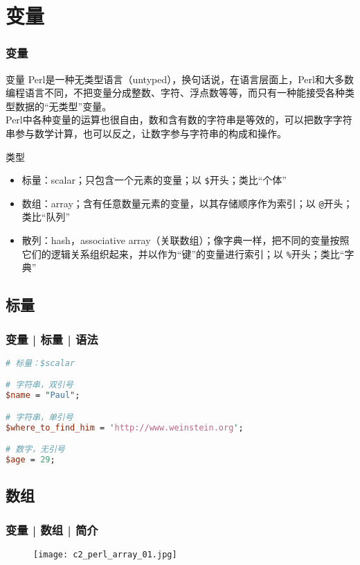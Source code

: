 \section{变量}
\begin{frame}[fragile]
  \frametitle{变量}
  \begin{block}{变量}
    Perl是一种无类型语言（untyped），换句话说，在语言层面上，Perl和大多数编程语言不同，不把变量分成整数、字符、浮点数等等，而只有一种能接受各种类型数据的“无类型”变量。\\
    Perl中各种变量的运算也很自由，数和含有数的字符串是等效的，可以把数字字符串参与数学计算，也可以反之，让数字参与字符串的构成和操作。
  \end{block}
  \pause
  \begin{block}{\alert{类型}}
    \begin{itemize}
      \item 标量：scalar；只包含一个元素的变量；以 \verb|$|开头；类比“个体”
      \item 数组：array；含有任意数量元素的变量，以其存储顺序作为索引；以 \verb|@|开头；类比“队列”
      \item 散列：hash，associative array（关联数组）；像字典一样，把不同的变量按照它们的逻辑关系组织起来，并以作为“键”的变量进行索引；以 \verb|%|开头；类比“字典”
    \end{itemize}
  \end{block}
\end{frame}

\subsection{标量}
\begin{frame}[fragile]
  \frametitle{变量 | 标量 | \alert{语法}}
  \vspace{-1.5em}
\begin{lstlisting}[language=Perl]
# 标量：$scalar

# 字符串，双引号
$name = "Paul";

# 字符串，单引号
$where_to_find_him = 'http://www.weinstein.org';

# 数字，无引号
$age = 29;
\end{lstlisting}
\end{frame}

\subsection{数组}
\begin{frame}
  \frametitle{变量 | 数组 | 简介}
  \begin{figure}
    \centering
    \texttt{[image: c2\_perl\_array\_01.jpg]}
  \end{figure}
\end{frame}

